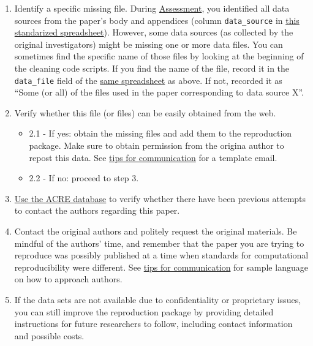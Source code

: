 \documentclass[]{book}
\providecommand{\tightlist}{%
  \setlength{\itemsep}{0pt}\setlength{\parskip}{0pt}}
\begin{document}
\begin{enumerate}
\def\labelenumi{\arabic{enumi}.}
\tightlist
\item
  Identify a specific missing file. During \protect\hyperlink{assessment}{Assessment}, you identified all data sources from the paper's body and appendices (column \texttt{data\_source} in \href{https://docs.google.com/spreadsheets/d/1LUIdVFH0OfR70C7z07TYeE-uWzKI_JIeWUMaYhqEKK0/edit\#gid=0\&range=A1}{this standarized spreadsheet}). However, some data sources (as collected by the original investigators) might be missing one or more data files. You can sometimes find the specific name of those files by looking at the beginning of the cleaning code scripts. If you find the name of the file, record it in the \texttt{data\_file} field of the \href{https://docs.google.com/spreadsheets/d/1LUIdVFH0OfR70C7z07TYeE-uWzKI_JIeWUMaYhqEKK0/edit\#gid=0\&range=A1}{same spreadsheet} as above. If not, recorded it as ``Some (or all) of the files used in the paper corresponding to data source X''.\\
\item
  Verify whether this file (or files) can be easily obtained from the web.

  \begin{itemize}
  \tightlist
  \item
    2.1 - If yes: obtain the missing files and add them to the reproduction package. Make sure to obtain permission from the origina author to repost this data. See \protect\hyperlink{tips-for-communication}{tips for communication} for a template email.\\
  \item
    2.2 - If no: proceed to step 3.\\
  \end{itemize}
\item
  \href{ADD\%20LINK}{Use the ACRE database} to verify whether there have been previous attempts to contact the authors regarding this paper.\\
\item
  Contact the original authors and politely request the original materials. Be mindful of the authors' time, and remember that the paper you are trying to reproduce was possibly published at a time when standards for computational reproducibility were different. See \protect\hyperlink{tips-for-communication}{tips for communication} for sample language on how to approach authors.\\
\item
  If the data sets are not available due to confidentiality or proprietary issues, you can still improve the reproduction package by providing detailed instructions for future researchers to follow, including contact information and possible costs.
\end{enumerate}
\end{document}
